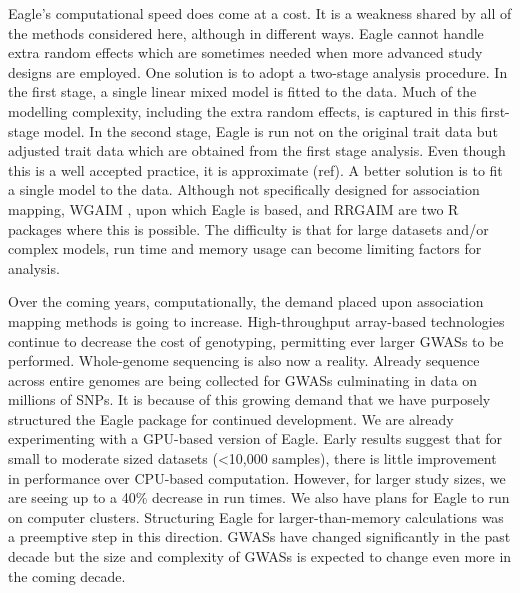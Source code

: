 \documentclass{article}
\begin{document}
Eagle's computational speed does come at a cost. It is a weakness shared by all of the methods considered here, although in different ways. 
Eagle cannot handle extra random effects which are sometimes needed when more advanced study designs are employed. One solution 
is to adopt a two-stage analysis procedure. In the first stage, a single linear mixed model is fitted to the data. Much of the modelling complexity, 
including the extra random effects, is 
captured in this first-stage model. In the second stage, Eagle is run not on the original trait data but adjusted trait data which are obtained from the first stage analysis. Even though this is a well accepted practice, it is approximate (ref).  A better solution is to fit a single model to the data. 
Although not specifically designed for association mapping,
WGAIM \cite{verbyla2007analysis}, upon which Eagle is based, and RRGAIM \cite{verbyla2012rwgaim}  are two R packages where this is possible. The difficulty is that for large datasets and/or complex 
models,  run time and memory usage can become limiting factors for analysis. 


Over the coming years, computationally, the demand placed upon association mapping methods is going to increase. 
High-throughput array-based technologies continue to decrease the cost of genotyping, permitting ever larger GWASs to be performed. 
Whole-genome sequencing is also now a reality. Already sequence across entire genomes are being collected for GWASs \cite{gudbjartsson2015large, long2017whole}
culminating in data on millions of SNPs. It is because of this growing demand that 
we have purposely structured the Eagle package for continued development. We are already experimenting with a GPU-based version of Eagle. 
Early results suggest that for small to moderate sized datasets (<10,000 samples), there is little improvement in performance over CPU-based 
computation.  However, for larger study sizes, we are seeing up to a 40\% decrease in run times.  
We also have plans for Eagle to run on computer clusters. Structuring Eagle for larger-than-memory calculations was a 
preemptive step in this direction. GWASs have changed significantly in the past decade but the size and complexity of GWASs is expected 
to change even more in the coming decade. 























\end{document}
